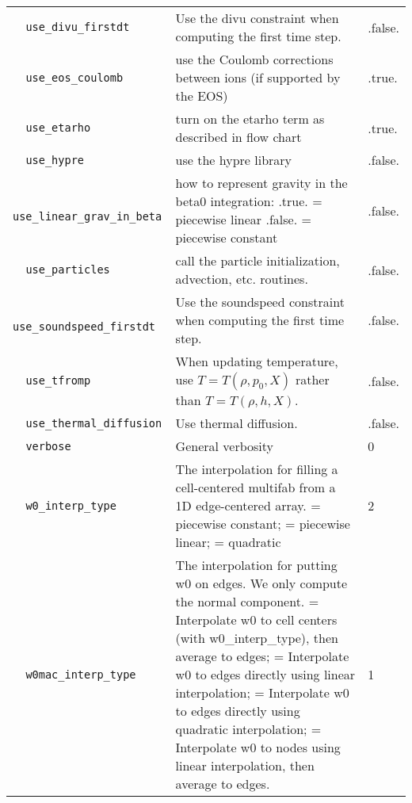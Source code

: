 \begin{landscape}
{\begin{center}
\begin{longtable}{|l|p{5.25in}|l|}
\rowcolor{tableShade}
\verb=  use_divu_firstdt  = &   Use the divu constraint when computing the first time step.  &  .false. \\
\verb=  use_eos_coulomb  = &   use the Coulomb corrections between ions (if supported by the EOS)  &  .true. \\
\rowcolor{tableShade}
\verb=  use_etarho  = &   turn on the etarho term as described in flow chart  &  .true. \\
\verb=  use_hypre  = &   use the hypre library  &  .false. \\
\rowcolor{tableShade}
\verb=  use_linear_grav_in_beta  = &   how to represent gravity in the beta0 integration: .true. = piecewise linear .false. = piecewise constant  &  .false. \\
\verb=  use_particles  = &   call the particle initialization, advection, etc. routines.  &  .false. \\
\rowcolor{tableShade}
\verb=  use_soundspeed_firstdt  = &   Use the soundspeed constraint when computing the first time step.  &  .false. \\
\verb=  use_tfromp  = &   When updating temperature, use $T=T(\rho,p_0,X) $ rather than $T=T(\rho,h,X)$.  &  .false. \\
\rowcolor{tableShade}
\verb=  use_thermal_diffusion  = &   Use thermal diffusion.  &  .false. \\
\verb=  verbose  = &   General verbosity  &  0 \\
\rowcolor{tableShade}
\verb=  w0_interp_type  = &   The interpolation for filling a cell-centered multifab from a 1D edge-centered array. \newline 1 = piecewise constant; \newline 2 = piecewise linear; \newline 3 = quadratic  &  2 \\
\verb=  w0mac_interp_type  = &   The interpolation for putting w0 on edges.  We only compute the normal component. \newline 1 = Interpolate w0 to cell centers (with w0\_interp\_type), then average to edges; \newline 2 = Interpolate w0 to edges directly using linear interpolation; \newline 3 = Interpolate w0 to edges directly using quadratic interpolation; \newline 4 = Interpolate w0 to nodes using linear interpolation, then average to edges.  &  1 \\


\end{longtable}
\end{center}

} %

\end{landscape}

%


